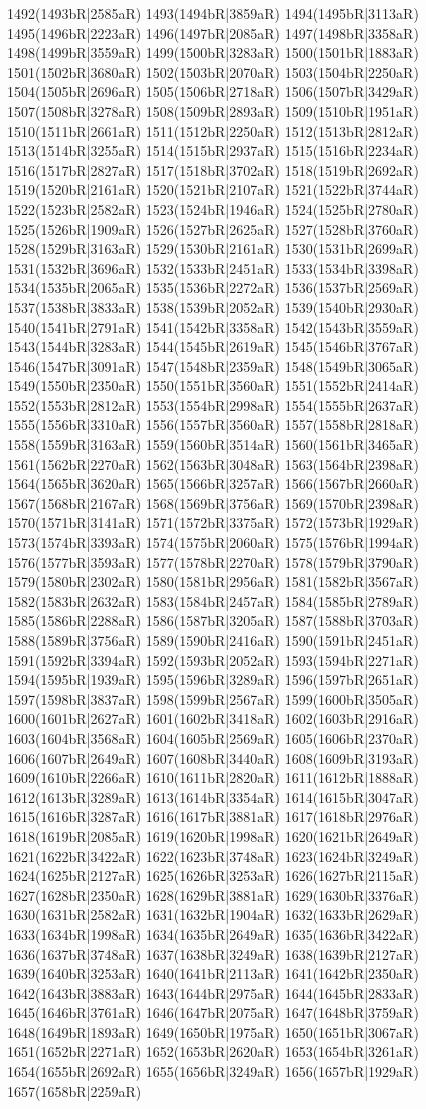 1492(1493bR|2585aR) 1493(1494bR|3859aR) 1494(1495bR|3113aR) 1495(1496bR|2223aR) 1496(1497bR|2085aR) 1497(1498bR|3358aR) 1498(1499bR|3559aR) 1499(1500bR|3283aR) 1500(1501bR|1883aR) 1501(1502bR|3680aR) 1502(1503bR|2070aR) 1503(1504bR|2250aR) 1504(1505bR|2696aR) 1505(1506bR|2718aR) 1506(1507bR|3429aR) 1507(1508bR|3278aR) 1508(1509bR|2893aR) 1509(1510bR|1951aR) 1510(1511bR|2661aR) 1511(1512bR|2250aR) 1512(1513bR|2812aR) 1513(1514bR|3255aR) 1514(1515bR|2937aR) 1515(1516bR|2234aR) 1516(1517bR|2827aR) 1517(1518bR|3702aR) 1518(1519bR|2692aR) 1519(1520bR|2161aR) 1520(1521bR|2107aR) 1521(1522bR|3744aR) 1522(1523bR|2582aR) 1523(1524bR|1946aR) 1524(1525bR|2780aR) 1525(1526bR|1909aR) 1526(1527bR|2625aR) 1527(1528bR|3760aR) 1528(1529bR|3163aR) 1529(1530bR|2161aR) 1530(1531bR|2699aR) 1531(1532bR|3696aR) 1532(1533bR|2451aR) 1533(1534bR|3398aR) 1534(1535bR|2065aR) 1535(1536bR|2272aR) 1536(1537bR|2569aR) 1537(1538bR|3833aR) 1538(1539bR|2052aR) 1539(1540bR|2930aR) 1540(1541bR|2791aR) 1541(1542bR|3358aR) 1542(1543bR|3559aR) 1543(1544bR|3283aR) 1544(1545bR|2619aR) 1545(1546bR|3767aR) 1546(1547bR|3091aR) 1547(1548bR|2359aR) 1548(1549bR|3065aR) 1549(1550bR|2350aR) 1550(1551bR|3560aR) 1551(1552bR|2414aR) 1552(1553bR|2812aR) 1553(1554bR|2998aR) 1554(1555bR|2637aR) 1555(1556bR|3310aR) 1556(1557bR|3560aR) 1557(1558bR|2818aR) 1558(1559bR|3163aR) 1559(1560bR|3514aR) 1560(1561bR|3465aR) 1561(1562bR|2270aR) 1562(1563bR|3048aR) 1563(1564bR|2398aR) 1564(1565bR|3620aR) 1565(1566bR|3257aR) 1566(1567bR|2660aR) 1567(1568bR|2167aR) 1568(1569bR|3756aR) 1569(1570bR|2398aR) 1570(1571bR|3141aR) 1571(1572bR|3375aR) 1572(1573bR|1929aR) 1573(1574bR|3393aR) 1574(1575bR|2060aR) 1575(1576bR|1994aR) 1576(1577bR|3593aR) 1577(1578bR|2270aR) 1578(1579bR|3790aR) 1579(1580bR|2302aR) 1580(1581bR|2956aR) 1581(1582bR|3567aR) 1582(1583bR|2632aR) 1583(1584bR|2457aR) 1584(1585bR|2789aR) 1585(1586bR|2288aR) 1586(1587bR|3205aR) 1587(1588bR|3703aR) 1588(1589bR|3756aR) 1589(1590bR|2416aR) 1590(1591bR|2451aR) 1591(1592bR|3394aR) 1592(1593bR|2052aR) 1593(1594bR|2271aR) 1594(1595bR|1939aR) 1595(1596bR|3289aR) 1596(1597bR|2651aR) 1597(1598bR|3837aR) 1598(1599bR|2567aR) 1599(1600bR|3505aR) 1600(1601bR|2627aR) 1601(1602bR|3418aR) 1602(1603bR|2916aR) 1603(1604bR|3568aR) 1604(1605bR|2569aR) 1605(1606bR|2370aR) 1606(1607bR|2649aR) 1607(1608bR|3440aR) 1608(1609bR|3193aR) 1609(1610bR|2266aR) 1610(1611bR|2820aR) 1611(1612bR|1888aR) 1612(1613bR|3289aR) 1613(1614bR|3354aR) 1614(1615bR|3047aR) 1615(1616bR|3287aR) 1616(1617bR|3881aR) 1617(1618bR|2976aR) 1618(1619bR|2085aR) 1619(1620bR|1998aR) 1620(1621bR|2649aR) 1621(1622bR|3422aR) 1622(1623bR|3748aR) 1623(1624bR|3249aR) 1624(1625bR|2127aR) 1625(1626bR|3253aR) 1626(1627bR|2115aR) 1627(1628bR|2350aR) 1628(1629bR|3881aR) 1629(1630bR|3376aR) 1630(1631bR|2582aR) 1631(1632bR|1904aR) 1632(1633bR|2629aR) 1633(1634bR|1998aR) 1634(1635bR|2649aR) 1635(1636bR|3422aR) 1636(1637bR|3748aR) 1637(1638bR|3249aR) 1638(1639bR|2127aR) 1639(1640bR|3253aR) 1640(1641bR|2113aR) 1641(1642bR|2350aR) 1642(1643bR|3883aR) 1643(1644bR|2975aR) 1644(1645bR|2833aR) 1645(1646bR|3761aR) 1646(1647bR|2075aR) 1647(1648bR|3759aR) 1648(1649bR|1893aR) 1649(1650bR|1975aR) 1650(1651bR|3067aR) 1651(1652bR|2271aR) 1652(1653bR|2620aR) 1653(1654bR|3261aR) 1654(1655bR|2692aR) 1655(1656bR|3249aR) 1656(1657bR|1929aR) 1657(1658bR|2259aR) 
